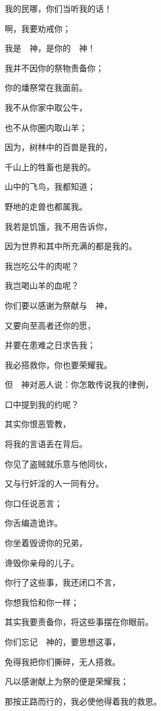 {\BB \par }{\Q {}我的民哪，你们当听我的话！
\par }{啊，我要劝戒你；
\par }{\Q 我是　神，是你的　神！
\par }{\Q {}我并不因你的祭物责备你；
\par }{\Q 你的燔祭常在我面前。
\par }{\Q {}我不从你家中取公牛，
\par }{\Q 也不从你圈内取山羊；
\par }{\Q {}因为，树林中的百兽是我的，
\par }{\Q 千山上的牲畜也是我的。
\par }{\Q {}山中的飞鸟，我都知道；
\par }{\Q 野地的走兽也都属我。
\par }{\BB \par }{\Q {}我若是饥饿，我不用告诉你，
\par }{\Q 因为世界和其中所充满的都是我的。
\par }{\Q {}我岂吃公牛的肉呢？
\par }{\Q 我岂喝山羊的血呢？
\par }{\Q {}你们要以感谢为祭献与　神，
\par }{\Q 又要向至高者还你的愿，
\par }{\Q {}并要在患难之日求告我；
\par }{\Q 我必搭救你，你也要荣耀我。
\par }{\BB \par }{\Q {}但　神对恶人说：你怎敢传说我的律例，
\par }{\Q 口中提到我的约呢？
\par }{\Q {}其实你恨恶管教，
\par }{\Q 将我的言语丢在背后。
\par }{\Q {}你见了盗贼就乐意与他同伙，
\par }{\Q 又与行奸淫的人一同有分。
\par }{\BB \par }{\Q {}你口任说恶言；
\par }{\Q 你舌编造诡诈。
\par }{\Q {}你坐着毁谤你的兄弟，
\par }{\Q 谗毁你亲母的儿子。
\par }{\Q {}你行了这些事，我还闭口不言，
\par }{\Q 你想我恰和你一样；
\par }{\Q 其实我要责备你，将这些事摆在你眼前。
\par }{\BB \par }{\Q {}你们忘记　神的，要思想这事，
\par }{\Q 免得我把你们撕碎，无人搭救。
\par }{\Q {}凡以感谢献上为祭的便是荣耀我；
\par }{\Q 那按正路而行的，我必使他得着我的救恩。

}
